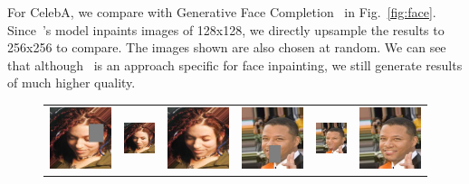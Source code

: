 For CelebA, we compare with Generative Face Completion~\cite{li2017generative} in Fig.~\ref{fig:face}. Since~\cite{li2017generative}'s model inpaints images of 128x128, we directly upsample the results to 256x256 to compare. The images shown are also chosen at random. We can see that although~\cite{li2017generative} is an approach specific for face inpainting, we still generate results of much higher quality.

\begin{figure}[h!]
\centering
\small
\begin{tabular}{cccccc}
\includegraphics[width=.16\textwidth]{figures/face/000189_input_image.jpg}&
\includegraphics[width=.16\textwidth]{figures/face/res1/res.jpg}&
\includegraphics[width=.16\textwidth]{figures/face/000189_synthesized_image.jpg}&
\includegraphics[width=.16\textwidth]{figures/face/000194_input_image.jpg}&
\includegraphics[width=.16\textwidth]{figures/face/res2/res.jpg}&
\includegraphics[width=.16\textwidth]{figures/face/000194_synthesized_image.jpg}\\

\end{tabular}
\end{figure}
